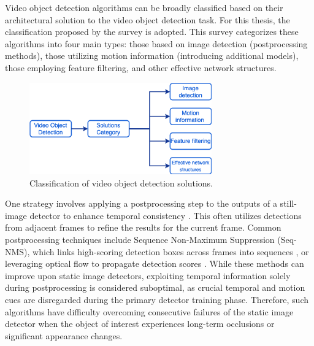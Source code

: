 
Video object detection algorithms can be broadly classified based on their architectural solution to the video object detection task. For this thesis, the classification proposed by the survey \cite{jiaoNewGenerationDeep2022} is adopted. This survey categorizes these algorithms into four main types: those based on image detection (postprocessing methods), those utilizing motion information (introducing additional models), those employing feature filtering, and other effective network structures.

\begin{figure}
    \centering
    \includegraphics[width=0.7\textwidth]{figures/figure_background_vod_classification.png}
    \caption{Classification of video object detection solutions.}
\label{fig:figure_background_vod_classification}
\end{figure}

One strategy involves applying a postprocessing step to the outputs of a still-image detector to enhance temporal consistency \cite{hanSeqNMSVideoObject2016, kangTCNNTubeletsConvolutional2018, kangObjectDetectionVideo2016}. This often utilizes detections from adjacent frames to refine the results for the current frame. Common postprocessing techniques include Sequence Non-Maximum Suppression (Seq-NMS), which links high-scoring detection boxes across frames into sequences \cite{hanSeqNMSVideoObject2016}, or leveraging optical flow to propagate detection scores \cite{kangTCNNTubeletsConvolutional2018, kangObjectDetectionVideo2016}. While these methods can improve upon static image detectors, exploiting temporal information solely during postprocessing is considered suboptimal, as crucial temporal and motion cues are disregarded during the primary detector training phase. Therefore, such algorithms have difficulty overcoming consecutive failures of the static image detector when the object of interest experiences long-term occlusions or significant appearance changes.

